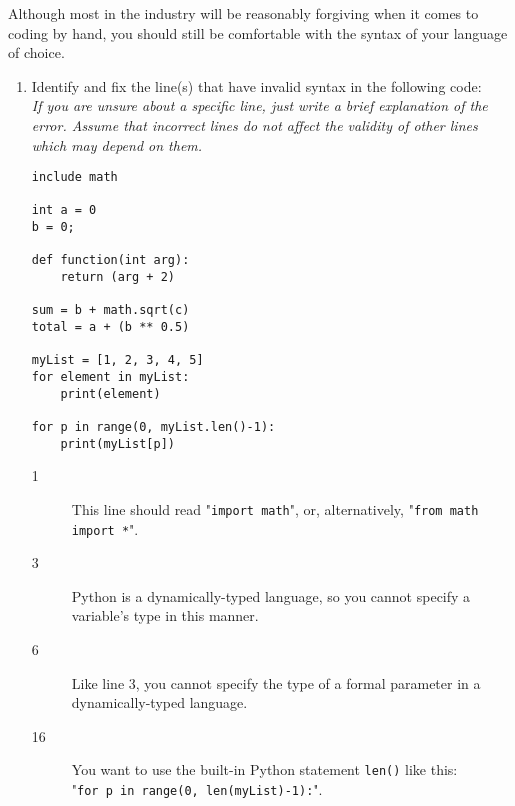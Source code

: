 Although most in the industry will be reasonably forgiving when it comes to coding by hand,
you should still be comfortable with the syntax of your language of choice.

\begin{enumerate}
\item Identify and fix the line(s) that have invalid syntax in the following code:\\
\emph{If you are unsure about a specific line, just write a brief explanation of the error. Assume that incorrect lines do not affect the validity of other lines which may depend on them.}
\begin{lstlisting}
include math

int a = 0
b = 0;

def function(int arg):
	return (arg + 2)

sum = b + math.sqrt(c)
total = a + (b ** 0.5)

myList = [1, 2, 3, 4, 5]
for element in myList:
	print(element)

for p in range(0, myList.len()-1):
	print(myList[p])
\end{lstlisting}

\begin{answer}
\begin{description}

	\item[1] This line should read "\texttt{import math}", or, alternatively, "\texttt{from math import *}".
	\item[3] Python is a dynamically-typed language, so you cannot specify a variable's type in this manner.
	\item[6] Like line 3, you cannot specify the type of a formal parameter in a dynamically-typed language.
	\item[16] You want to use the built-in Python statement \texttt{len()} like this:\\
	 "\texttt{for p in range(0, len(myList)-1):}".

\end{description}
\end{answer}


\end{enumerate}
